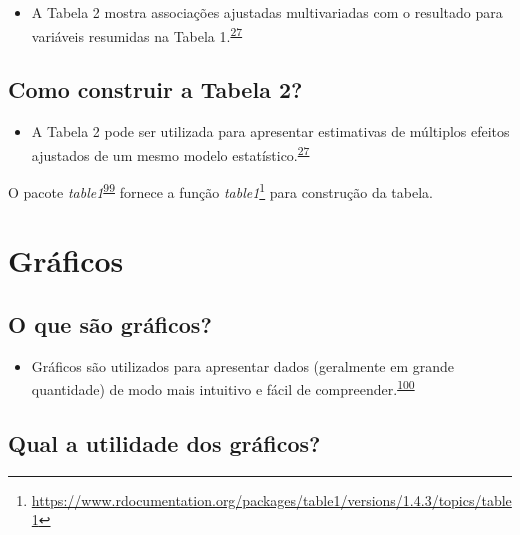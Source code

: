 \documentclass[
  a4paper,
]{book}
\providecommand{\tightlist}{%
  \setlength{\itemsep}{0pt}\setlength{\parskip}{0pt}}
\renewcommand{\href}[2]{#2\footnote{\url{#1}}}
\newenvironment{infobox}[1]
  {
  \begin{itemize}
  \renewcommand{\labelitemi}{
    \raisebox{-.7\height}[0pt][0pt]{
      {\setkeys{Gin}{width=3em,keepaspectratio}
        \texttt{[image: \#1]}}
    }
  }
  \setlength{\fboxsep}{1em}
  \begin{blackbox}
  \item
  }
  {
  \end{blackbox}
  \end{itemize}
  }
\begin{document}
\begin{itemize}
\tightlist
\item
  A Tabela 2 mostra associações ajustadas multivariadas com o resultado para variáveis resumidas na Tabela 1.\textsuperscript{\protect\hyperlink{ref-Westreich2013}{27}}
\end{itemize}

\hypertarget{como-construir-a-tabela-2}{%
\subsection{Como construir a Tabela 2?}\label{como-construir-a-tabela-2}}

\begin{itemize}
\tightlist
\item
  A Tabela 2 pode ser utilizada para apresentar estimativas de múltiplos efeitos ajustados de um mesmo modelo estatístico.\textsuperscript{\protect\hyperlink{ref-Westreich2013}{27}}
\end{itemize}

\begin{infobox}{images/Rlogo}
O pacote \emph{table1}\textsuperscript{\protect\hyperlink{ref-table1}{99}} fornece a função \href{https://www.rdocumentation.org/packages/table1/versions/1.4.3/topics/table1}{\emph{table1}} para construção da tabela.

\end{infobox}

\hypertarget{graficos}{%
\section{Gráficos}\label{graficos}}

\hypertarget{o-que-suxe3o-gruxe1ficos}{%
\subsection{O que são gráficos?}\label{o-que-suxe3o-gruxe1ficos}}

\begin{itemize}
\tightlist
\item
  Gráficos são utilizados para apresentar dados (geralmente em grande quantidade) de modo mais intuitivo e fácil de compreender.\textsuperscript{\protect\hyperlink{ref-Park2022}{100}}
\end{itemize}

\hypertarget{qual-a-utilidade-dos-gruxe1ficos}{%
\subsection{Qual a utilidade dos gráficos?}\label{qual-a-utilidade-dos-gruxe1ficos}}
\end{document}
